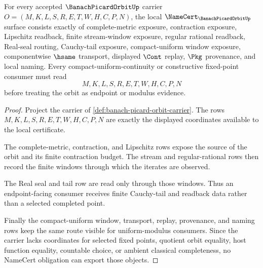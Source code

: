\begin{theorem}
\label{thm:banach-picard-orbit-namecert-obligations}
For every accepted $\BanachPicardOrbitUp$ carrier $O=(M,K,L,S,R,E,T,W,H,C,P,N)$, the local $\NameCert_{\BanachPicardOrbitUp}$ surface consists exactly of complete-metric exposure, contraction exposure, Lipschitz readback, finite stream-window exposure, regular rational readback, Real-seal routing, Cauchy-tail exposure, compact-uniform window exposure, componentwise $\hsame$ transport, displayed $\Cont$ replay, $\Pkg$ provenance, and local naming. Every compact-uniform-continuity or constructive fixed-point consumer must read
$$
M,K,L,S,R,E,T,W,H,C,P,N
$$
before treating the orbit as endpoint or modulus evidence.
\end{theorem}
\begin{proof}
Project the carrier of \autoref{def:banach-picard-orbit-carrier}. The rows $M,K,L,S,R,E,T,W,H,C,P,N$ are exactly the displayed coordinates available to the local certificate.

The complete-metric, contraction, and Lipschitz rows expose the source of the orbit and its finite contraction budget. The stream and regular-rational rows then record the finite windows through which the iterates are observed.

The Real seal and tail row are read only through those windows. Thus an endpoint-facing consumer receives finite Cauchy-tail and readback data rather than a selected completed point.

Finally the compact-uniform window, transport, replay, provenance, and naming rows keep the same route visible for uniform-modulus consumers. Since the carrier lacks coordinates for selected fixed points, quotient orbit equality, host function equality, countable choice, or ambient classical completeness, no NameCert obligation can export those objects.
\end{proof}


